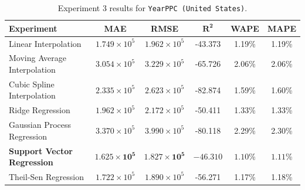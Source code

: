 \begin{table}[!ht]
	\centering
	\caption{\centering Experiment 3 results for \texttt{YearPPC (United States)}.}
	\begin{tabular}{@{}lccccc@{}}
		\toprule
		\textbf{Experiment}                & \textbf{MAE}                   & \textbf{RMSE}                  & $\mathbf{R^2}$       & \textbf{WAPE}       & \textbf{MAPE}       \\
		\midrule
		Linear Interpolation               & \(1.749 \times 10^5\)          & \(1.962 \times 10^5\)          & -43.373              & 1.19\%              & 1.19\%              \\
		Moving Average Interpolation       & \(3.054 \times 10^5\)          & \(3.229 \times 10^5\)          & -65.726              & 2.06\%              & 2.06\%              \\
		Cubic Spline Interpolation         & \(2.335 \times 10^5\)          & \(2.623 \times 10^5\)          & -82.874              & 1.59\%              & 1.60\%              \\
		Ridge Regression                   & \(1.962 \times 10^5\)          & \(2.172 \times 10^5\)          & -50.411              & 1.33\%              & 1.33\%              \\
		Gaussian Process Regression        & \(3.370 \times 10^5\)          & \(3.990 \times 10^5\)          & -80.118              & 2.29\%              & 2.30\%              \\
		\textbf{Support Vector Regression} & \(\mathbf{1.625 \times 10^5}\) & \(\mathbf{1.827 \times 10^5}\) & \(\mathbf{-46.310}\) & \(\mathbf{1.10}\)\% & \(\mathbf{1.11}\)\% \\
		Theil-Sen Regression               & \(1.722 \times 10^5\)          & \(1.890 \times 10^5\)          & -56.271              & 1.17\%              & 1.18\%              \\
		\hline
	\end{tabular}
	\label{tab:reconstruction_united_states}
\end{table}
